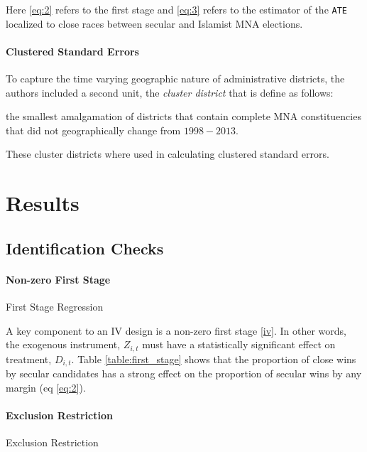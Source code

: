 \documentclass{scrartcl}
\begin{document}
Here \ref{eq:2} refers to the first stage and \ref{eq:3} refers to the estimator of the \texttt{ATE} localized to close races between secular and Islamist MNA elections.  

\paragraph{Clustered Standard Errors}

To capture the time varying geographic nature of administrative districts, the authors included a second unit, the \textit{cluster district} that is define as follows:

\begin{displayquote}
  the smallest amalgamation of districts that contain complete MNA constituencies that did not geographically change from $1998 - 2013$.
\end{displayquote}

These cluster districts where used in calculating clustered standard errors.


\section{Results}

\subsection{Identification Checks}

\paragraph{Non-zero First Stage}

\begin{table}[ht]
  \begin{center}
    \scalebox{0.85}{
      
    }
    \caption{First Stage Regression}
    \label{table:first_stage}
  \end{center}
\end{table}

A key component to an IV design is a non-zero first stage \ref{iv}. In other words, the exogenous instrument, $Z_{i,t}$ must have a statistically significant effect on treatment, $D_{i,t}$. Table \ref{table:first_stage} shows that the proportion of close wins by secular candidates has a strong effect on the proportion of secular wins by any margin (eq \ref{eq:2}).

\paragraph{Exclusion Restriction}
\begin{table}[ht]
  \begin{center}
    \scalebox{0.725}{
      
    }
    \caption{Exclusion Restriction}
    \label{table:exclusion_restriction}
  \end{center}
\end{table}
\end{document}
